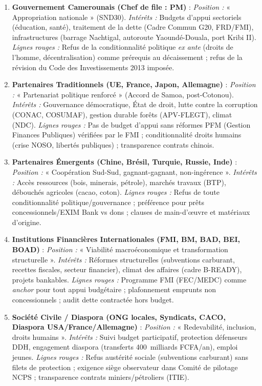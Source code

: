 \documentclass[11pt]{article}
\begin{document}
\begin{enumerate}
    \item \textbf{Gouvernement Camerounais (Chef de file : PM)} : \textit{Position :} « Appropriation nationale » (SND30). \textit{Intérêts :} Budgets d'appui sectoriels (éducation, santé), traitement de la dette (Cadre Commun G20, FRD/FMI), infrastructures (barrage Nachtigal, autoroute Yaoundé-Douala, port Kribi II). \textit{Lignes rouges :} Refus de la conditionnalité politique \emph{ex ante} (droits de l'homme, décentralisation) comme prérequis au décaissement ; refus de la révision du Code des Investissements 2013 imposée.
    \item \textbf{Partenaires Traditionnels (UE, France, Japon, Allemagne)} : \textit{Position :} « Partenariat politique renforcé » (Accord de Samoa, post-Cotonou). \textit{Intérêts :} Gouvernance démocratique, État de droit, lutte contre la corruption (CONAC, COSUMAF), gestion durable forêts (APV-FLEGT), climat (NDC). \textit{Lignes rouges :} Pas de budget d'appui sans réformes PFM (Gestion Finances Publiques) vérifiées par le FMI ; conditionnalité droits humains (crise NOSO, libertés publiques) ; transparence contrats chinois.
    \item \textbf{Partenaires Émergents (Chine, Brésil, Turquie, Russie, Inde)} : \textit{Position :} « Coopération Sud-Sud, gagnant-gagnant, non-ingérence ». \textit{Intérêts :} Accès ressources (bois, minerais, pétrole), marchés travaux (BTP), débouchés agricoles (cacao, coton). \textit{Lignes rouges :} Refus de toute conditionnalité politique/gouvernance ; préférence pour prêts concessionnels/EXIM Bank vs dons ; clauses de main-d'œuvre et matériaux d'origine.
    \item \textbf{Institutions Financières Internationales (FMI, BM, BAD, BEI, BOAD)} : \textit{Position :} « Viabilité macroéconomique et transformation structurelle ». \textit{Intérêts :} Réformes structurelles (subventions carburant, recettes fiscales, secteur financier), climat des affaires (cadre B-READY), projets bankables. \textit{Lignes rouges :} Programme FMI (FEC/MEDC) comme \emph{anchor} pour tout appui budgétaire ; plafonnement emprunts non concessionnels ; audit dette contractée hors budget.
    \item \textbf{Société Civile / Diaspora (ONG locales, Syndicats, CACO, Diaspora USA/France/Allemagne)} : \textit{Position :} « Redevabilité, inclusion, droits humains ». \textit{Intérêts :} Suivi budget participatif, protection défenseurs DDH, engagement diaspora (transferts \SI{400}{milliards} FCFA/an), emploi jeunes. \textit{Lignes rouges :} Refus austérité sociale (subventions carburant) sans filets de protection ; exigence siège observateur dans Comité de pilotage NCPS ; transparence contrats miniers/pétroliers (ITIE).

\end{enumerate}
\end{document}
